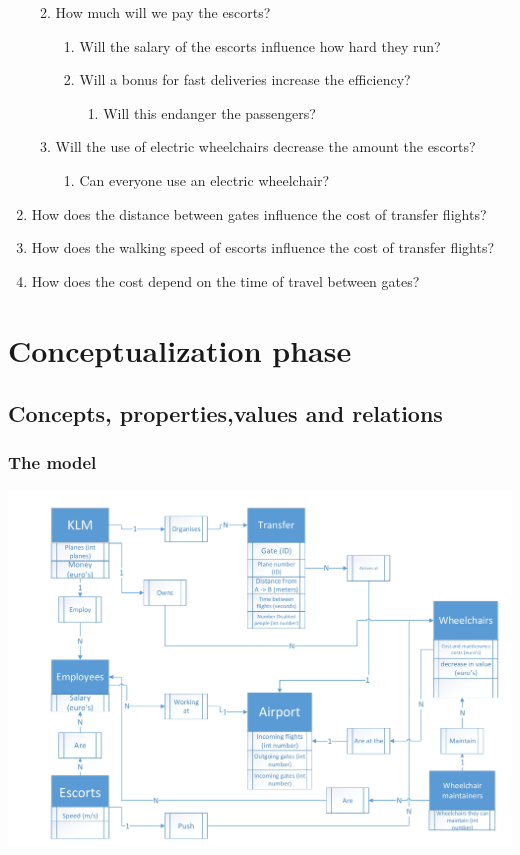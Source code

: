 \documentclass[a4paper, 12pt, notitlepage]{report}
\begin{document}
\begin{enumerate}
\begin{enumerate}
\begin{enumerate}
		\end{enumerate}
	\item How much will we pay the escorts?
		\begin{enumerate}
		\item Will the salary of the escorts influence how hard they run?
		\item Will a  bonus for fast deliveries increase the efficiency?
			\begin{enumerate}
			\item Will this endanger the passengers?
			\end{enumerate}
		\end{enumerate}
	\item Will the use of electric wheelchairs decrease the amount the escorts?
		\begin{enumerate}
			\item Can everyone use an electric wheelchair?
		\end{enumerate}
	\end{enumerate}
		
\item How does the distance between gates influence the cost of transfer flights?
\item How does the walking speed of escorts influence the cost of transfer flights?
\item How does the cost depend on the time of travel between gates?
\end{enumerate}


\chapter{Conceptualization phase}
\section{Concepts, properties,values and relations}

\subsection{The model}
\includegraphics[scale=0.5]{Conceptualmodel.pdf}
\end{document}
